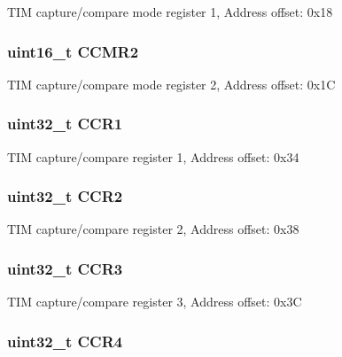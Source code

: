 T\-I\-M capture/compare mode register 1, Address offset\-: 0x18 \hypertarget{struct_t_i_m___type_def_a977b3cf310388b5ad02440d64d03810a}{
\subsubsection[{C\-C\-M\-R2}]{ uint16\-\_\-t C\-C\-M\-R2}}\label{struct_t_i_m___type_def_a977b3cf310388b5ad02440d64d03810a}
T\-I\-M capture/compare mode register 2, Address offset\-: 0x1\-C \hypertarget{struct_t_i_m___type_def_adab1e24ef769bbcb3e3769feae192ffb}{
\subsubsection[{C\-C\-R1}]{ uint32\-\_\-t C\-C\-R1}}\label{struct_t_i_m___type_def_adab1e24ef769bbcb3e3769feae192ffb}
T\-I\-M capture/compare register 1, Address offset\-: 0x34 \hypertarget{struct_t_i_m___type_def_ab90aa584f07eeeac364a67f5e05faa93}{
\subsubsection[{C\-C\-R2}]{ uint32\-\_\-t C\-C\-R2}}\label{struct_t_i_m___type_def_ab90aa584f07eeeac364a67f5e05faa93}
T\-I\-M capture/compare register 2, Address offset\-: 0x38 \hypertarget{struct_t_i_m___type_def_a27a478cc47a3dff478555ccb985b06a2}{
\subsubsection[{C\-C\-R3}]{ uint32\-\_\-t C\-C\-R3}}\label{struct_t_i_m___type_def_a27a478cc47a3dff478555ccb985b06a2}
T\-I\-M capture/compare register 3, Address offset\-: 0x3\-C \hypertarget{struct_t_i_m___type_def_a85fdb75569bd7ea26fa48544786535be}{
\subsubsection[{C\-C\-R4}]{ uint32\-\_\-t C\-C\-R4}}\label{struct_t_i_m___type_def_a85fdb75569bd7ea26fa48544786535be}
